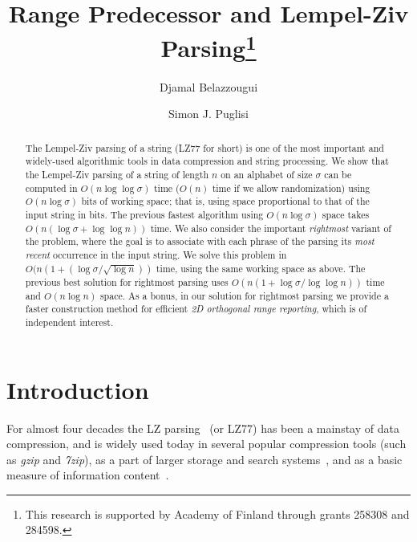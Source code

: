 \documentclass[11pt,runningheads]{llncs}
\begin{document}
\title{Range Predecessor and Lempel-Ziv Parsing\thanks{This research is
    supported by Academy of Finland through grants 258308 and 284598.}}

\author{
Djamal Belazzougui
\and
Simon J. Puglisi
}


\date{}

\maketitle \thispagestyle{empty}
\setcounter{page}{0}

\begin{abstract}
The Lempel-Ziv parsing of a string (LZ77 for short) is one of the most
important and widely-used algorithmic tools in data compression and string
processing.
We show that the Lempel-Ziv parsing of a string of length $n$ on an alphabet of size
$\sigma$ can be computed in $O(n\log\log\sigma)$ time ($O(n)$ time if we allow
randomization) using $O(n\log\sigma)$ bits
of working space; that is, using space proportional to that of the input string in
bits. The previous fastest algorithm using $O(n\log\sigma)$ space takes $O(n(\log\sigma+\log\log n))$ time.
We also consider the important {\em rightmost} variant of the problem,
where the goal is
to associate with each phrase of the parsing its {\em most recent} occurrence in the input
string. We solve this problem in
$O(n(1 + (\log\sigma/\sqrt{\log n}))$ time, using the same working
space as above. The previous best solution for rightmost parsing uses $O(n(1+\log\sigma/\log\log n))$
time and $O(n\log n)$ space.
As a bonus, in our solution for rightmost parsing we provide a faster construction
method for efficient {\em 2D orthogonal range reporting}, which is of independent interest.
\end{abstract}

\newpage


\section{Introduction}
\label{sec-intro}

For almost four decades the LZ parsing~\cite{ZL77} (or LZ77) has been a 
mainstay of data compression, and is widely used today in several 
popular compression tools (such as {\em gzip} and {\em 7zip}), as a part 
of larger storage and search systems~\cite{lucene,fm2010,lemur},
and as a basic measure of information content~\cite{cllppss2005}.
\end{document}
